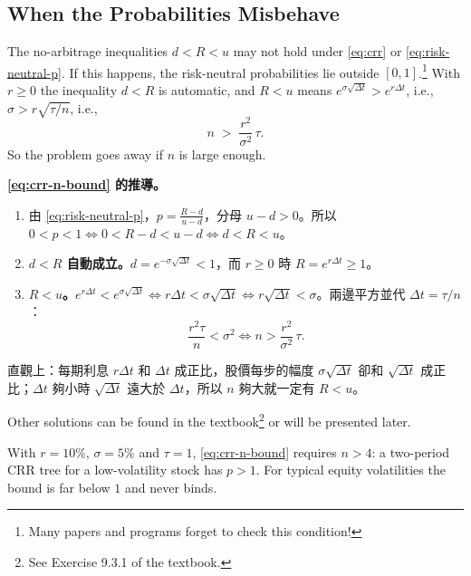 \subsection{When the Probabilities Misbehave}


\suppstart
{}
\suppend

The no-arbitrage inequalities $d<R<u$ may not hold under \eqref{eq:crr} or \eqref{eq:risk-neutral-p}.
If this happens, the risk-neutral probabilities lie outside $[0,1]$.\footnote{Many papers and programs forget to check this condition!}
\suppstart
With $r\ge0$ the inequality $d<R$ is automatic, and $R<u$ means $e^{\sigma\sqrt{\Delta t}}>e^{r\Delta t}$, i.e., $\sigma>r\sqrt{\tau/n}$, i.e.,
\suppend
\begin{equation}
	n \;>\; \frac{r^{2}}{\sigma^{2}}\,\tau .
	\label{eq:crr-n-bound}
\end{equation}
So the problem goes away if $n$ is large enough.

\suppstart
\begin{remark}
	\textbf{\eqref{eq:crr-n-bound} 的推導。}
	\begin{enumerate}[(1),nosep]
		\item 由 \eqref{eq:risk-neutral-p}，$p=\frac{R-d}{u-d}$，分母 $u-d>0$。所以 $0<p<1\iff0<R-d<u-d\iff d<R<u$。
		\item \textbf{$d<R$ 自動成立。}$d=e^{-\sigma\sqrt{\Delta t}}<1$，而 $r\ge0$ 時 $R=e^{r\Delta t}\ge1$。
		\item \textbf{$R<u$。}$e^{r\Delta t}<e^{\sigma\sqrt{\Delta t}}\iff r\Delta t<\sigma\sqrt{\Delta t}\iff r\sqrt{\Delta t}<\sigma$。兩邊平方並代 $\Delta t=\tau/n$：
		\[
			\frac{r^{2}\tau}{n}<\sigma^{2}\iff n>\frac{r^{2}}{\sigma^{2}}\,\tau .
		\]
	\end{enumerate}
	直觀上：每期利息 $r\Delta t$ 和 $\Delta t$ 成正比，股價每步的幅度 $\sigma\sqrt{\Delta t}$ 卻和 $\sqrt{\Delta t}$ 成正比；$\Delta t$ 夠小時 $\sqrt{\Delta t}$ 遠大於 $\Delta t$，所以 $n$ 夠大就一定有 $R<u$。
\end{remark}
Other solutions can be found in the textbook\footnote{See Exercise 9.3.1 of the textbook.} or will be presented later.

\begin{eg}
	With $r=10\%$, $\sigma=5\%$ and $\tau=1$, \eqref{eq:crr-n-bound} requires $n>4$: a two-period CRR tree for a low-volatility stock has $p>1$.
	For typical equity volatilities the bound is far below $1$ and never binds.
\end{eg}
\suppend

